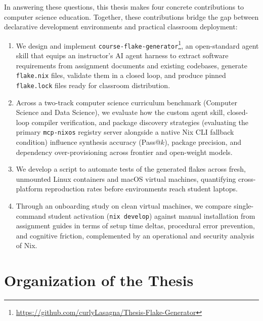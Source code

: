 In answering these questions, this thesis makes four concrete contributions to computer
science education. Together, these contributions bridge the gap between declarative
development environments and practical classroom deployment:
\begin{enumerate}
    \item We design and implement \texttt{course-flake-generator}\footnote{\url{https://github.com/curlyLasagna/Thesis-Flake-Generator}},
        an open-standard agent skill that equips an instructor's AI agent
        harness to extract software requirements from assignment documents and
        existing codebases, generate \texttt{flake.nix} files, validate them in a
        closed loop, and produce pinned \texttt{flake.lock} files ready for classroom
        distribution.

    \item Across a two-track computer science curriculum benchmark (Computer
        Science and Data Science), we evaluate how the custom agent skill, closed-loop
        compiler verification, and package discovery strategies (evaluating the primary
        \texttt{mcp-nixos} registry server alongside a native Nix CLI fallback
        condition) influence synthesis accuracy (Pass@$k$), package precision,
        and dependency over-provisioning across frontier and open-weight models.

    \item We develop a script to automate tests of the generated flakes across fresh,
        unmounted Linux containers and macOS virtual machines, quantifying cross-platform
        reproduction rates before environments reach student laptops.

    \item Through an onboarding study on clean virtual machines, we compare
        single-command student activation (\texttt{nix develop}) against manual installation
        from assignment guides in terms of setup time deltas, procedural error
        prevention, and cognitive friction, complemented by an operational and
        security analysis of Nix.
\end{enumerate}

\section{Organization of the Thesis}

